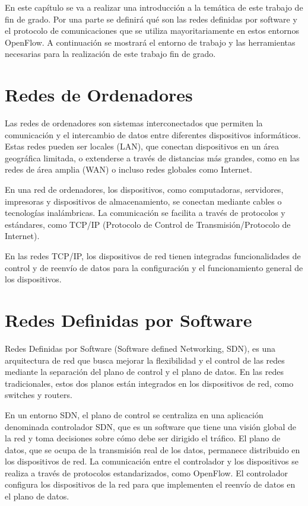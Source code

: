 \documentclass[a4paper, 12pt]{book}
\begin{document}
	
	En este capítulo se va a realizar una introducción a la temática de este trabajo de fin de grado. Por una
	parte se definirá qué son las redes definidas por software y el protocolo de comunicaciones que
	se utiliza mayoritariamente en estos entornos OpenFlow. A continuación se mostrará el entorno
	de trabajo y las herramientas necesarias para la realización de este trabajo fin de grado.
	
	
	\section{Redes de Ordenadores} 
	\label{sec:redes}
	
	Las redes de ordenadores son sistemas interconectados que permiten la comunicación y el intercambio de datos entre diferentes dispositivos informáticos. Estas redes pueden ser locales (LAN), que conectan dispositivos en un área geográfica limitada, o extenderse a través de distancias más grandes, como en las redes de área amplia (WAN) o incluso redes globales como Internet.
	
	En una red de ordenadores, los dispositivos, como computadoras, servidores, impresoras y dispositivos de almacenamiento, se conectan mediante cables o tecnologías inalámbricas. La comunicación se facilita a través de protocolos y estándares, como TCP/IP (Protocolo de Control de Transmisión/Protocolo de Internet).
	
	En las redes TCP/IP, los dispositivos de red tienen integradas funcionalidades de
	control y de reenvío de datos para la configuración	y el funcionamiento general de los dispositivos. 
	
	\section{Redes Definidas por Software} 
	\label{sec:sdn}
	
	Redes Definidas por Software (Software defined Networking, SDN), es una arquitectura de red que busca mejorar la flexibilidad y el control de las redes mediante la separación del plano de control y el plano de datos. En las redes tradicionales, estos dos planos están integrados en los dispositivos de red, como switches y routers.
	
	En un entorno SDN, el plano de control se centraliza en una aplicación denominada controlador SDN, que es un software que tiene una visión global de la red y toma decisiones sobre cómo debe ser dirigido el tráfico. El plano de datos, que se ocupa de la transmisión real de los datos, permanece distribuido en los dispositivos de red. La comunicación entre el controlador y los dispositivos se realiza a través de protocolos estandarizados, como OpenFlow. El controlador configura los dispositivos de la red para que implementen el reenvío de datos en el plano de datos.
	
\end{document}
